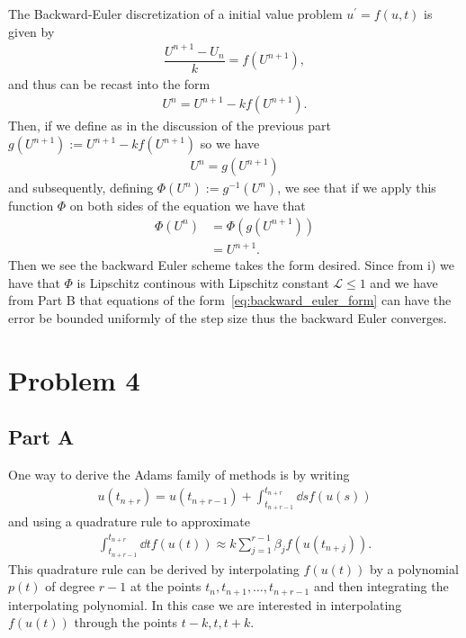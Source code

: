 \documentclass[12pt]{article}
\begin{document}
The Backward-Euler discretization of a initial value problem $u^{\prime} = f(u, t)$ is given by
\begin{align}
    \dfrac{U^{n+1}-U_{n}}{k} = f(U^{n+1}),
\end{align}
and thus can be recast into the form 
\begin{align}
    U^{n} = U^{n+1} - kf(U^{n+1}).
\end{align}
Then, if we define as in the discussion of the previous part $g(U^{n+1}) := U^{n+1} - kf(U^{n+1})$ so we have
\begin{align}
    U^{n} = g(U^{n+1})
\end{align}
and subsequently, defining $\Phi(U^{n}) := g^{-1}(U^{n})$, we see that if we apply this function $\Phi$ on both sides of the equation we have that
\begin{subequations}
    \begin{align}
        \Phi(U^{n}) &= \Phi(g(U^{n+1})) \\
        &= U^{n+1}.
    \end{align}
    \label{eq:backward_euler_form}
\end{subequations}
Then we see the backward Euler scheme takes the form desired. Since from i) we have that $\Phi$ is Lipschitz continous with Lipschitz constant $\mathcal{L} \le 1$ and we have from Part B that equations of the form~\eqref{eq:backward_euler_form} can have the error be bounded uniformly of the step size thus the backward Euler converges. 




\section*{Problem 4}

\subsection*{Part A}

One way to derive the Adams family of methods is by writing 
\begin{align}
	u(t_{n+r}) = u(t_{n+r-1}) + \int_{t_{n+r-1}}^{t_{n+r}}\dd{s} f(u(s))
\end{align}
and using a quadrature rule to approximate
\begin{align}
	\int_{t_{n+r-1}}^{t_{n+r}}\dd{t}f(u(t)) \approx k\sum_{j=1}^{r-1}\beta_{j}f(u(t_{n+j})).
\end{align}
This quadrature rule can be derived by interpolating $f(u(t))$ by a polynomial $p(t)$ of degree $r-1$ at the points $t_{n},t_{n+1},\dots,t_{n+r-1}$ and then integrating the interpolating polynomial. In this case we are interested in interpolating $f(u(t))$ through the points $t-k,t,t+k$. 
\end{document}
